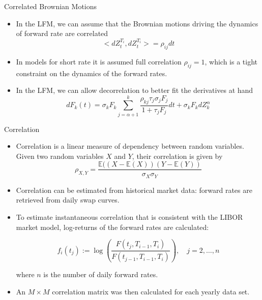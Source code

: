 \documentclass{beamer}
\begin{document}
\begin{frame}{Correlated Brownian Motions}
  \begin{itemize}
  \item In the LFM, we can assume that the Brownian motions driving the dynamics of forward rate are correlated
    \begin{equation}
      <dZ_t^{T_i}, dZ_t^{T_i}> = \rho_{ij}dt
    \end{equation}
  \item In models for short rate it is assumed full correlation $\rho_{ij}=1$, which is a tight constraint on the dynamics of the forward rates.
  \item In the LFM, we can allow decorrelation to better fit the derivatives at hand
    \begin{equation*}
      dF_k(t) = \sigma_kF_k\sum_{j=\alpha+1}^k\frac{\boxed{\rho_{kj}}\tau_j\sigma_jF_j}{1+\tau_jF_j}dt+\sigma_kF_k dZ^\alpha_k
    \end{equation*}
  \end{itemize}
\end{frame}

\begin{frame}{Correlation}
  \begin{itemize}
  \item Correlation is a linear measure of dependency between random variables. Given two random variables $X$ and $Y$, their correlation is given by
    \begin{equation*}
      \rho_{X,Y} = \frac{\mathbb{E}((X-\mathbb{E}(X))(Y-\mathbb{E}(Y))}{\sigma_X \sigma_Y}
    \end{equation*}
    
  \item Correlation can be estimated from historical market data: forward rates are retrieved from daily swap curves.
  \item To estimate instantaneous correlation that is consistent with the LIBOR market model, log-returns of the forward rates are calculated:
    
    \begin{equation*}
      f_i(t_j) := \log\left(\frac{F(t_j, T_{i-1}, T_i)}{F(t_{j-1}, T_{i-1}, T_i)}\right), \quad j=2,\ldots,n
    \end{equation*}
    
    where $n$ is the number of daily forward rates. %
  \item  An $M \times M$ correlation matrix was then calculated for each yearly data set.
  \end{itemize}
\end{frame}
\end{document}
